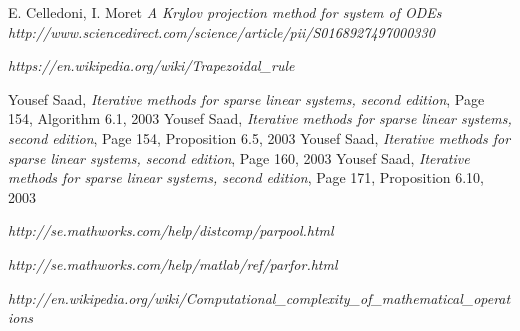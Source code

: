 \newpage
\begin{thebibliography}{9}

    
    E. Celledoni, I. Moret
    \emph{A Krylov projection method for system of ODEs}
    \emph{http://www.sciencedirect.com/science/article/pii/S0168927497000330}
    
    \emph{https://en.wikipedia.org/wiki/Trapezoidal\_rule}

    Yousef Saad,
    \emph{Iterative methods for sparse linear systems, second edition},
    Page 154,
    Algorithm 6.1,
    2003
    Yousef Saad,
    \emph{Iterative methods for sparse linear systems, second edition},
    Page 154,
    Proposition 6.5,
    2003
    Yousef Saad,
    \emph{Iterative methods for sparse linear systems, second edition},
    Page 160,
    2003
    Yousef Saad,
    \emph{Iterative methods for sparse linear systems, second edition},
    Page 171, 
    Proposition 6.10,
    2003
    
    \emph{http://se.mathworks.com/help/distcomp/parpool.html}
    
    \emph{http://se.mathworks.com/help/matlab/ref/parfor.html}
    
    \emph{http://en.wikipedia.org/wiki/Computational\_complexity\_of\_mathematical\_operations}
    
    
\end{thebibliography}

